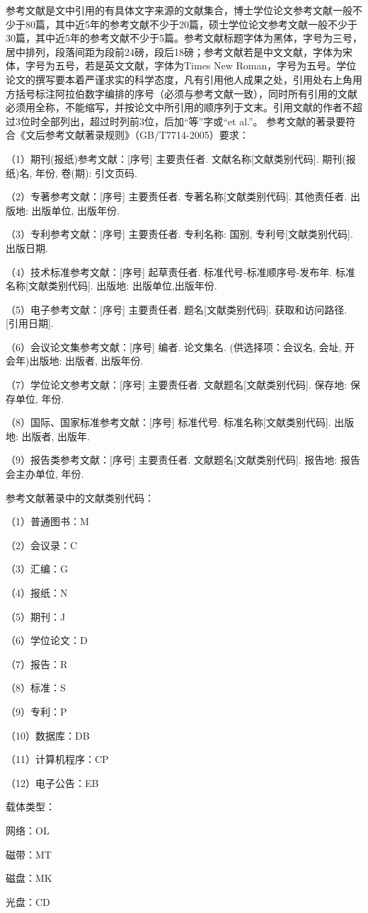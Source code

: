 参考文献是文中引用的有具体文字来源的文献集合，博士学位论文参考文献一般不少于80篇，其中近5年的参考文献不少于20篇，硕士学位论文参考文献一般不少于30篇，其中近5年的参考文献不少于5篇。参考文献标题字体为黑体，字号为三号，居中排列，段落间距为段前24磅，段后18磅；参考文献若是中文文献，字体为宋体，字号为五号，若是英文文献，字体为Times New Roman，字号为五号。学位论文的撰写要本着严谨求实的科学态度，凡有引用他人成果之处，引用处右上角用方括号标注阿拉伯数字编排的序号（必须与参考文献一致），同时所有引用的文献必须用全称，不能缩写，并按论文中所引用的顺序列于文末。引用文献的作者不超过3位时全部列出，超过时列前3位，后加“等”字或“et al.”。 参考文献的著录要符合《文后参考文献著录规则》（GB/T7714-2005）要求：

（1）期刊(报纸)参考文献：[序号] 主要责任者. 文献名称[文献类别代码]. 期刊(报纸)名, 年份, 卷(期): 引文页码.

（2）专著参考文献：[序号] 主要责任者. 专著名称[文献类别代码]. 其他责任者. 出版地: 出版单位, 出版年份.

（3）专利参考文献：[序号] 主要责任者. 专利名称: 国别, 专利号[文献类别代码]. 出版日期.

（4）技术标准参考文献：[序号] 起草责任者. 标准代号-标准顺序号-发布年. 标准名称[文献类别代码]. 出版地: 出版单位,出版年份.

（5）电子参考文献：[序号] 主要责任者. 题名[文献类别代码]. 获取和访问路径. [引用日期].

（6）会议论文集参考文献：[序号] 编者. 论文集名. (供选择项：会议名, 会址, 开会年)出版地: 出版者, 出版年份.

（7）学位论文参考文献：[序号]  主要责任者. 文献题名[文献类别代码]. 保存地: 保存单位, 年份.

（8）国际、国家标准参考文献：[序号] 标准代号. 标准名称[文献类别代码]. 出版地: 出版者, 出版年.

（9）报告类参考文献：[序号] 主要责任者. 文献题名[文献类别代码]. 报告地: 报告会主办单位, 年份.

参考文献著录中的文献类别代码：

（1）普通图书：M     \par
（2）会议录：C       \par
（3）汇编：G         \par
（4）报纸：N         \par
（5）期刊：J         \par
（6）学位论文：D     \par
（7）报告：R         \par
（8）标准：S         \par
（9）专利：P         \par
（10）数据库：DB     \par
（11）计算机程序：CP \par
（12）电子公告：EB   \par
载体类型：           \par
网络：OL             \par
磁带：MT             \par
磁盘：MK             \par
光盘：CD

